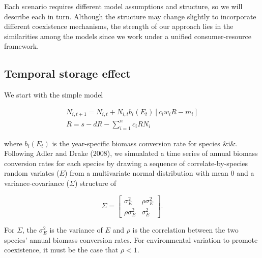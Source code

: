 \documentclass[12pt]{article}
\begin{document}
Each scenario requires different model assumptions and structure, so we will describe each in turn. Although the structure may change slightly to incorporate different coexistence mechanisms, the strength of our approach lies in the similarities among the models since we work under a unified consumer-resource framework.

\subsection{Temporal storage effect}
We start with the simple model

\begin{gather}
N_{i,t+1} =N_{i,t} + N_{i,t}b_{i}(E_{t})[c_{i}w_{i}R-m_{i}]\\
R =s-dR-\sum_{i=1}^{n} c_{i}RN_{i}
\end{gather}

where $b_{i}(E_{t})$ is the year-specific biomass conversion rate for species &i&. Following Adler and Drake (2008), we simualated a time series of annual biomass conversion rates for each species by drawing a sequence of correlate-by-species random variates ($E$) from a multivariate normal distribution with mean 0 and a variance-covariance ($\Sigma$) structure of

\[ \Sigma = \left[ \begin{array}{cc}
\sigma^{2}_{E} & \rho\sigma^{2}_{E} \\
\rho\sigma^{2}_{E} & \sigma^{2}_{E} \end{array} \right].\]

For $\Sigma$, the $\sigma^{2}_{E}$ is the variance of $E$ and $\rho$ is the correlation between the two species' annual biomass conversion rates. For environmental variation to promote coexistence, it must be the case that $\rho<1$.

\end{document}
